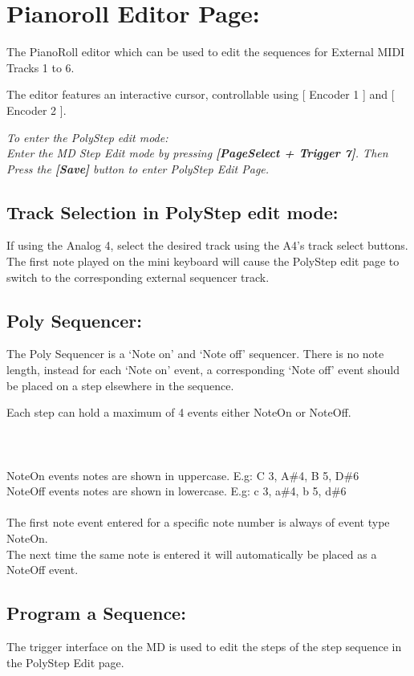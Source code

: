 \chapter{Pianoroll Editor Page:}
The PianoRoll editor which can be used to edit the sequences for External MIDI Tracks 1 to 6.

The editor features an interactive cursor, controllable using [ Encoder 1 ]
    and [ Encoder 2 ].

\textit{To enter the PolyStep edit mode:\\Enter the MD Step Edit mode by pressing \textbf{[PageSelect + Trigger 7]}. Then Press the \textbf{[Save]} button to enter PolyStep Edit Page.}\\
\section{Track Selection in PolyStep edit mode:}
If using the Analog 4, select the desired track using the A4’s track select buttons. The first note played on the mini keyboard will cause the PolyStep edit page to switch to  the corresponding external sequencer track.
\section{Poly Sequencer: }
The Poly Sequencer is a ‘Note on’ and ‘Note off’ sequencer. There is no note length, instead for each ‘Note on’ event, a corresponding ‘Note off’ event should be placed on a step elsewhere in the sequence.

Each step can hold a maximum of 4 events either NoteOn or NoteOff.\\\\
\\
\\
NoteOn events notes are shown in uppercase. E.g: C 3, A\#4, B 5, D\#6
\\NoteOff events notes are shown in lowercase. E.g: c 3, a\#4, b 5, d\#6
\\\\
The first note event entered for a specific note number is always of event type NoteOn.\\
The next time the same note is entered it will automatically be placed as a NoteOff event.

\section{Program a Sequence: }
The trigger interface on the MD is used to edit the steps of the step sequence in the PolyStep Edit page.


